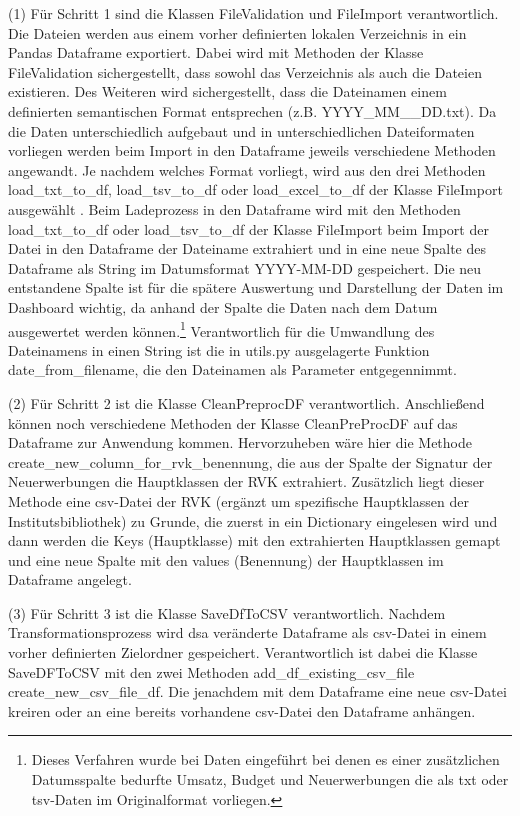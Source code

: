     
    (1) Für Schritt 1 sind die Klassen FileValidation und FileImport verantwortlich.
    Die Dateien werden aus einem vorher definierten lokalen Verzeichnis in ein Pandas Dataframe exportiert. Dabei wird mit Methoden
    der Klasse FileValidation sichergestellt, dass sowohl das Verzeichnis als auch die Dateien existieren. Des Weiteren wird sichergestellt,
    dass die Dateinamen einem definierten semantischen Format entsprechen (z.B. YYYY_MM__DD.txt). 
    Da die Daten unterschiedlich aufgebaut und in unterschiedlichen Dateiformaten vorliegen werden beim Import in den Dataframe jeweils verschiedene Methoden angewandt. Je
    nachdem welches Format vorliegt, wird aus den drei Methoden load_txt_to_df, load_tsv_to_df oder load_excel_to_df der Klasse FileImport ausgewählt .
    Beim Ladeprozess in den Dataframe wird mit den Methoden load_txt_to_df oder load_tsv_to_df der Klasse FileImport beim Import der Datei in den Dataframe der Dateiname
    extrahiert und in eine neue Spalte des Dataframe als String im Datumsformat YYYY-MM-DD gespeichert. Die neu entstandene Spalte ist für die spätere Auswertung und
    Darstellung der Daten im Dashboard wichtig, da anhand der Spalte die Daten nach dem Datum ausgewertet werden können.\footnote{Dieses Verfahren wurde bei Daten eingeführt
    bei denen es einer zusätzlichen Datumsspalte bedurfte Umsatz,
    Budget und Neuerwerbungen die als txt oder tsv-Daten im Originalformat vorliegen.} Verantwortlich für die Umwandlung des Dateinamens in einen String ist die in utils.py
    ausgelagerte Funktion date_from_filename, die den Dateinamen als Parameter entgegennimmt. 
    
    
    
    (2) Für Schritt 2 ist die Klasse CleanPreprocDF verantwortlich. 
    Anschließend können noch verschiedene Methoden der Klasse CleanPreProcDF auf das Dataframe zur Anwendung kommen. Hervorzuheben wäre hier die Methode 
    create_new_column_for_rvk_benennung, die aus der Spalte der Signatur der Neuerwerbungen die Hauptklassen der RVK extrahiert. Zusätzlich liegt dieser Methode eine csv-Datei
    der RVK (ergänzt um spezifische Hauptklassen der Institutsbibliothek) zu Grunde, die zuerst in ein Dictionary eingelesen wird und dann werden die Keys (Hauptklasse) mit den
    extrahierten Hauptklassen gemapt und eine neue Spalte mit den values (Benennung) der Hauptklassen im Dataframe angelegt.    
    
    
    (3)  Für Schritt 3 ist die Klasse SaveDfToCSV verantwortlich.
    Nachdem Transformationsprozess wird dsa veränderte Dataframe als csv-Datei in einem vorher definierten Zielordner gespeichert. Verantwortlich ist dabei die Klasse    
    SaveDFToCSV mit den zwei Methoden add_df_existing_csv_file create_new_csv_file_df. Die jenachdem mit dem Dataframe eine neue csv-Datei kreiren oder an eine bereits       
    vorhandene csv-Datei den Dataframe anhängen.
    
